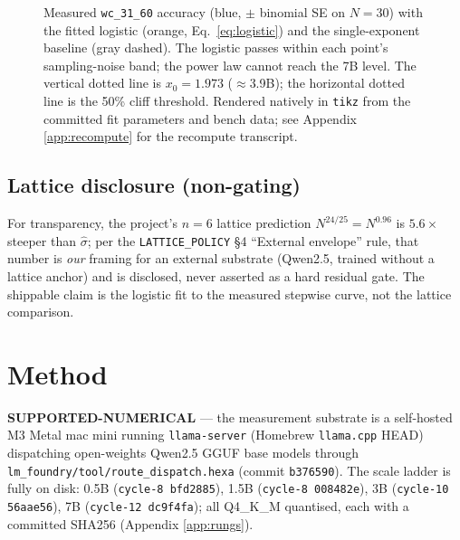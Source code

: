 \documentclass[11pt,a4paper]{article}
\newcommand{\green}[1]{\textcolor{green!50!black}{\textbf{#1}}}
\begin{document}
\begin{figure}[t]
  \caption{Measured \texttt{wc\_31\_60} accuracy (blue, $\pm$ binomial SE on
    $N{=}30$) with the fitted logistic (orange, Eq.~\ref{eq:logistic}) and the
    single-exponent baseline (gray dashed). The logistic passes within each
    point's sampling-noise band; the power law cannot reach the 7B level. The
    vertical dotted line is $x_0{=}1.973$ ($\approx$3.9B); the horizontal
    dotted line is the 50\% cliff threshold. Rendered natively in \texttt{tikz}
    from the committed fit parameters and bench data; see Appendix
    \ref{app:recompute} for the recompute transcript.}
  \label{fig:cliff-data}
\end{figure}

\subsection{Lattice disclosure (non-gating)}
For transparency, the project's \(n{=}6\) lattice prediction
\(N^{24/25}=N^{0.96}\) is \(5.6\times\) steeper than \(\hat{\sigma}\); per the
\texttt{LATTICE\_POLICY} §4 ``External envelope'' rule, that number is
\emph{our} framing for an external substrate (Qwen2.5, trained without a
lattice anchor) and is disclosed, never asserted as a hard residual gate.
The shippable claim is the logistic fit to the measured stepwise curve, not
the lattice comparison.

\section{Method}
\label{sec:method}
\green{SUPPORTED-NUMERICAL} --- the measurement substrate is a self-hosted M3
Metal mac mini running \texttt{llama-server} (Homebrew \texttt{llama.cpp}
HEAD) dispatching open-weights Qwen2.5 GGUF base models through
\texttt{lm\_foundry/tool/route\_dispatch.hexa} (commit \texttt{b376590}). The
scale ladder is fully on disk: 0.5B (\texttt{cycle-8 bfd2885}), 1.5B
(\texttt{cycle-8 008482e}), 3B (\texttt{cycle-10 56aae56}), 7B
(\texttt{cycle-12 dc9f4fa}); all Q4\_K\_M quantised, each with a committed
SHA256 (Appendix \ref{app:rungs}).
\end{document}
